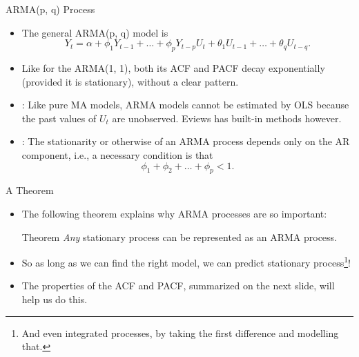\begin{frame}{ARMA(p, q) Process}
\begin{itemize}
\item The general ARMA(p, q) model is
\begin{equation*}
Y_t= \alpha+\phi_1 Y_{t-1}+\ldots+\phi_p Y_{t-p}  U_t + \theta_1 U_{t-1} + \ldots+\theta_q U_{t-q}.
\end{equation*}
\item Like for the ARMA(1, 1), both its ACF and PACF decay exponentially (provided it is stationary), without a clear pattern.
\item {}: Like pure MA models, ARMA models cannot be estimated by OLS because the past values of $U_{t}$ are unobserved. Eviews has built-in methods however.
\item {}: The stationarity or otherwise of an ARMA process depends only on the AR component, i.e., a necessary condition is that
\begin{equation*}
\phi _1+\phi _2+\ldots +\phi _p<1 .
\end{equation*}
\end{itemize}
\end{frame}
\begin{frame}{A Theorem}
\begin{itemize}
\item The following theorem explains why ARMA processes are so important:
\begin{block}{Theorem}
\emph{\color{red}Any} stationary process can be represented as an ARMA process.
\end{block}
\item So as long as we can find the right model, we can predict  stationary process\footnote{And even integrated processes, by taking the first difference and modelling that.}!
\item The properties of the ACF and PACF, summarized on the next slide, will help us do this.
\end{itemize}
\end{frame}

